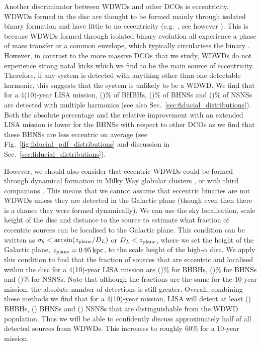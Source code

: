 Another discriminator between WDWDs and other DCOs is eccentricity. WDWDs formed in the disc are thought to be formed mainly through isolated binary formation and have little to no eccentricity (e.g.\ \citealt{Nelemans+2001}, see however \citealt{Dosopoulou+2016a, Dosopoulou+2016b, Gosnell+2019}). This is because WDWDs formed through isolated binary evolution all experience a phase of mass transfer or a common envelope, which typically circularises the binary \citep[e.g.][]{Marsh+2004}. However, in contrast to the more massive DCOs that we study, WDWDs do not experience strong natal kicks which we find to be the main source of eccentricity. Therefore, if any system is detected with anything other than one detectable harmonic, this suggests that the system is unlikely to be a WDWD. We find that for a 4(10)-year LISA mission, \BHBHMultipleHarmonicsFourPerc{}(\BHBHMultipleHarmonicsTenPerc{})\% of BHBHs, \BHNSMultipleHarmonicsFourPerc{}(\BHNSMultipleHarmonicsTenPerc{})\% of BHNSs and \NSNSMultipleHarmonicsFourPerc(\NSNSMultipleHarmonicsTenPerc{})\% of NSNSs are detected with multiple harmonics (see also Sec.~\ref{sec:fiducial_distributions}). Both the absolute percentage and the relative improvement with an extended LISA mission is lower for the BHNSs with respect to other DCOs as we find that these BHNSs are less eccentric on average (see Fig.~\ref{fig:fiducial_pdf_distributions} and discussion in Sec.~\ref{sec:fiducial_distributions}).

However, we should also consider that eccentric WDWDs could be formed through dynamical formation in Milky Way globular clusters \citep[e.g.][]{Willems+2007, Kremer+2018}, or with third companions \citep[e.g.][]{Antonini+2017}. This means that we cannot assume that eccentric binaries are not WDWDs unless they are detected in the Galactic plane (though even then there is a chance they were formed dynamically). We can use the sky localisation, scale height of the disc and distance to the source to estimate what fraction of eccentric sources can be localised to the Galactic plane. This condition can be written as $\sigma_\theta < \arcsin(z_{\rm plane} / D_L)$ or $D_L < z_{\rm plane}$, where we set the height of the Galactic plane, $z_{\rm plane}=0.95 \unit{kpc}$, to the scale height of the high-$\alpha$ disc. We apply this condition to find that the fraction of sources that are eccentric and localised within the disc for a 4(10)-year LISA mission are \BHBHEccInDiscFourPerc{}(\BHBHEccInDiscTenPerc{})\% for BHBHs, \BHNSEccInDiscFourPerc{}(\BHNSEccInDiscTenPerc{})\% for BHNSs and \NSNSEccInDiscFourPerc{}(\NSNSEccInDiscTenPerc{})\% for NSNSs. Note that although the fractions are the same for the 10-year mission, the absolute number of detections is still greater. Overall, combining these methods we find that for a 4(10)-year mission, LISA will detect at least \BHBHNotWDWDFour{}(\BHBHNotWDWDTen{}) BHBHs, \BHNSNotWDWDFour{}(\BHNSNotWDWDTen{}) BHNSs and \NSNSNotWDWDFour{}(\NSNSNotWDWDTen{}) NSNSs that are distinguishable from the WDWD population. Thus we will be able to confidently discuss approximately half of all detected sources from WDWDs. This increases to roughly 60\% for a 10-year mission.

